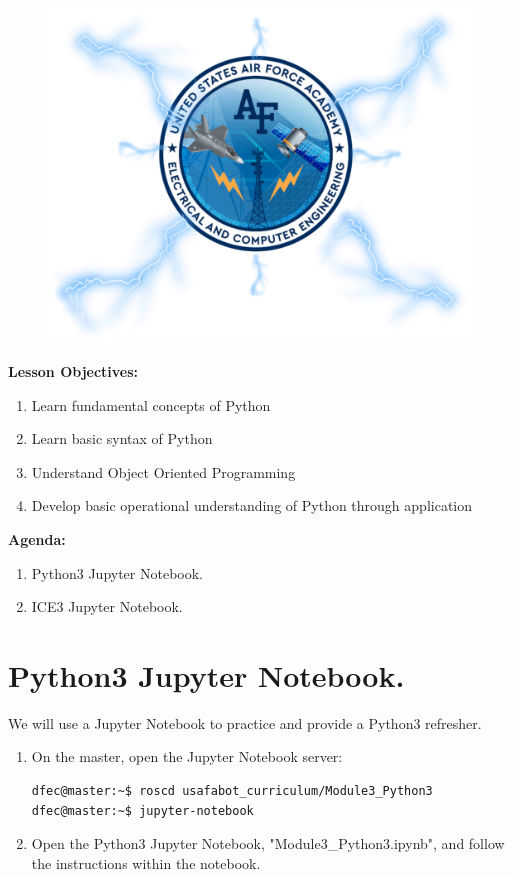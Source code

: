 \documentclass{handout}
\begin{document}
\maketitle

\begin{figure}[H]
	\centering
	\includegraphics[width=.75\textwidth]{Cover.PNG}
\end{figure}

\textbf{Lesson Objectives:}
\begin{enumerate} \setlength\itemsep{0em}
	\item Learn fundamental concepts of Python
	\item Learn basic syntax of Python
	\item Understand Object Oriented Programming
	\item Develop basic operational understanding of Python through application
\end{enumerate}

\textbf{Agenda:}
\begin{enumerate} \setlength\itemsep{0em}
	\item Python3 Jupyter Notebook.
	\item ICE3 Jupyter Notebook.
\end{enumerate}

\newpage
\clearpage
\pagebreak

\section{Python3 Jupyter Notebook.}
We will use a Jupyter Notebook to practice and provide a Python3 refresher.

\begin{enumerate}
	\item On the master, open the Jupyter Notebook server:
	
\begin{lstlisting}[language=bash]
dfec@master:~$ roscd usafabot_curriculum/Module3_Python3
dfec@master:~$ jupyter-notebook
\end{lstlisting}
	
	\item Open the Python3 Jupyter Notebook, "Module3\_Python3.ipynb", and follow the instructions within the notebook.
	
\end{enumerate}
\end{document}
